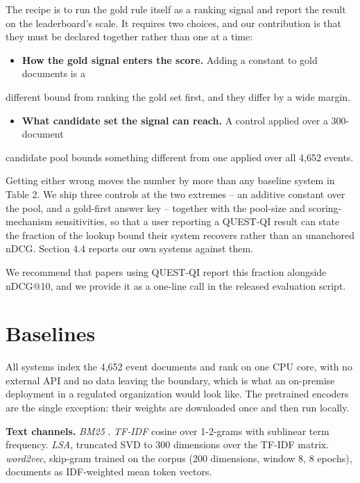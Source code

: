 \documentclass[runningheads]{llncs}
\begin{document}
The recipe is to run the gold rule itself as a ranking signal and report the result on the leaderboard's scale. It requires two choices, and our contribution is that they must be declared together rather than one at a time:

\begin{itemize}
\item \textbf{How the gold signal enters the score.} Adding a constant to gold documents is a
\end{itemize}

different bound from ranking the gold set first, and they differ by a wide margin.

\begin{itemize}
\item \textbf{What candidate set the signal can reach.} A control applied over a 300-document
\end{itemize}

candidate pool bounds something different from one applied over all 4,652 events.

Getting either wrong moves the number by more than any baseline system in Table 2. We ship three controls at the two extremes -- an additive constant over the pool, and a gold-first answer key -- together with the pool-size and scoring-mechanism sensitivities, so that a user reporting a QUEST-QI result can state the fraction of the lookup bound their system recovers rather than an unanchored nDCG. Section 4.4 reports our own systems against them.

We recommend that papers using QUEST-QI report this fraction alongside nDCG@10, and we provide it as a one-line call in the released evaluation script.


\section{Baselines}
All systems index the 4,652 event documents and rank on one CPU core, with no external API and no data leaving the boundary, which is what an on-premise deployment in a regulated organization would look like. The pretrained encoders are the single exception: their weights are downloaded once and then run locally.

\textbf{Text channels.} \textit{BM25} \cite{robertson2009bm25}. \textit{TF-IDF} cosine over 1-2-grams with sublinear term frequency. \textit{LSA}, truncated SVD to 300 dimensions over the TF-IDF matrix. \textit{word2vec}, skip-gram trained on the corpus (200 dimensions, window 8, 8 epochs), documents as IDF-weighted mean token vectors.
\end{document}
